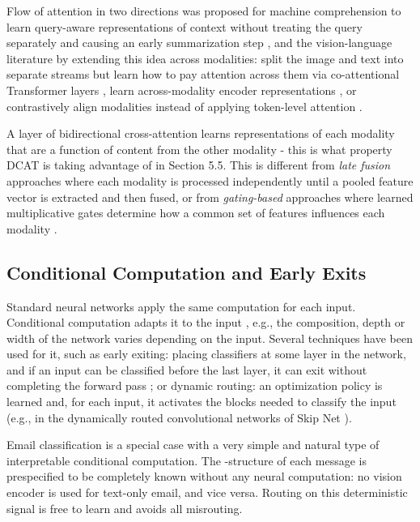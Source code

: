 \documentclass[10pt,twoside]{article}
\begin{document}
Flow of attention in two directions was proposed for machine comprehension to learn query-aware representations of context without treating the query separately and causing an early summarization step \citep{seo2017bidaf}, and the vision-language literature by extending this idea across modalities: split the image and text into separate streams but learn how to pay attention across them via co-attentional Transformer layers \citep{lu2019vilbert}, learn across-modality encoder representations \citep{tan2019lxmert}, or contrastively align modalities instead of applying token-level attention \citep{radford2021clip}.

A layer of bidirectional cross-attention learns representations of each modality that are a function of content from the other modality - this is what property DCAT is taking advantage of in Section 5.5. This is different from \emph{late fusion} approaches where each modality is processed independently until a pooled feature vector is extracted and then fused, or from \emph{gating-based} approaches where learned multiplicative gates determine how a common set of features influences each modality \citep{arevalo2017gmu}.

\subsection{Conditional Computation and Early Exits}\label{sec:2.6}

Standard neural networks apply the same computation for each input. Conditional computation adapts it to the input \citep{han2022dynamicsurvey}, e.g., the composition, depth or width of the network varies depending on the input. Several techniques have been used for it, such as early exiting: placing classifiers at some layer in the network, and if an input can be classified before the last layer, it can exit without completing the forward pass \citep{teerapittayanon2016branchynet}; or dynamic routing: an optimization policy is learned and, for each input, it activates the blocks needed to classify the input (e.g., in the dynamically routed convolutional networks of Skip Net \citep{wang2018skipnet}).

Email classification is a special case with a very simple and natural type of interpretable conditional computation. The -structure of each message is prespecified to be completely known without any neural computation: no vision encoder is used for text-only email, and vice versa. Routing on this deterministic signal is free to learn and avoids all misrouting.
\end{document}
